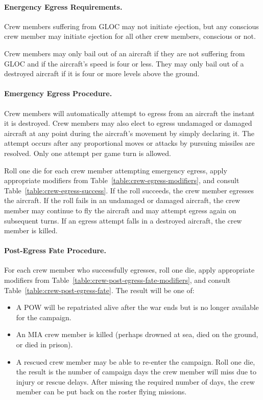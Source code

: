 \begin{advancedrules}
{\paragraph{Energency Egress Requirements.} Crew members suffering from GLOC may not initiate ejection, but any conscious crew member may initiate ejection for all other crew members, conscious or not.

Crew members may only bail out of an aircraft if they are not suffering from GLOC and if the aircraft's speed is four or less. They may only bail out of a destroyed aircraft if it is four or more levels above the ground.

\paragraph{Emergency Egress Procedure.} Crew members will automatically attempt to egress from an aircraft the instant it is destroyed. Crew members may also elect to egress undamaged or damaged aircraft at any point during the aircraft's movement by simply declaring it. The attempt occurs after any proportional moves or attacks by pursuing missiles are resolved. Only one attempt per game turn is allowed.

Roll one die for each crew member attempting emergency egress, apply appropriate modifiers from Table~\ref{table:crew-egress-modifiers}, and consult Table~\ref{table:crew-egress-success}. If the roll succeeds, the crew member egresses the aircraft. If the roll fails in an undamaged or damaged aircraft, the crew member may continue to fly the aircraft and may attempt egress again on subsequent turns. If an egress attempt falls in a destroyed aircraft, the crew member is killed.


\paragraph{Post-Egress Fate Procedure.\label{rule:post-egress-fate}} 
For each crew member who successfully egresses, roll one die, apply appropriate modifiers from Table~\ref{table:crew-post-egress-fate-modifiers}, and consult Table~\ref{table:crew-post-egress-fate}. The result will be one of:

\begin{itemize}
    \item {} A POW will be repatriated alive after the war ends but is no longer available for the campaign.
    \item {} An MIA crew member is killed (perhaps drowned at sea, died on the ground, or died in prison).
    \item {} A rescued crew member may be able to re-enter the campaign. Roll one die, the result is the number of campaign days the crew member will miss due to injury or rescue delays. After missing the required number of days, the crew member can be put back on the roster flying missions.


\end{itemize}}
\end{advancedrules}
